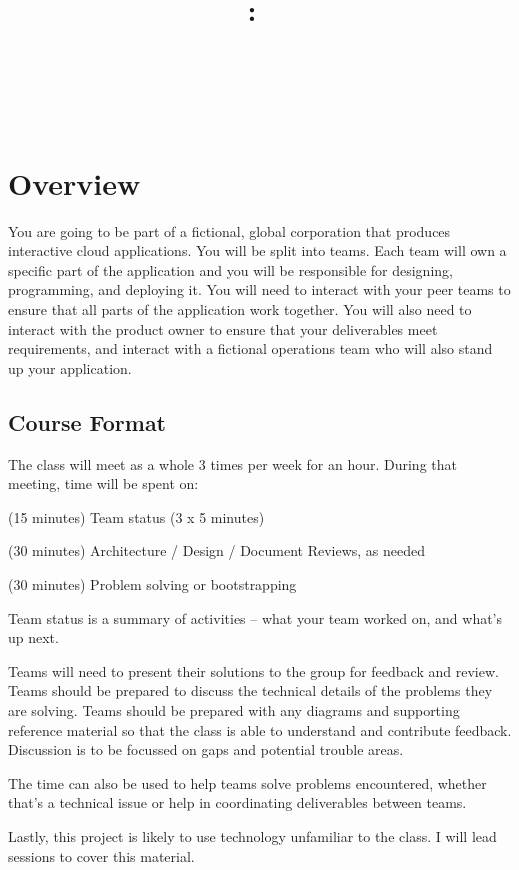 \documentclass{article}
\title{
\vspace{2in}
\textmd{\textbf{\hmwkClass:\ \hmwkTitle}}\\
\normalsize\vspace{0.1in}\hmwkDueDate\\
\vspace{0.1in}\large{\textit{\hmwkClassInstructor\ \hmwkClassTime}}
\vspace{3in}
}
\author{\textbf{\hmwkAuthorName}}
\date{} %
\newcommand{\enterProblemHeader}[1]{
}
\newcommand{\exitProblemHeader}[1]{
\nobreak\extramarks{#1}{}\nobreak
}
\newcounter{homeworkProblemCounter} %
\newcommand{\homeworkProblemName}{}
\newenvironment{homeworkProblem}[1][Problem \arabic{homeworkProblemCounter}]{ %
\stepcounter{homeworkProblemCounter} %
\renewcommand{\homeworkProblemName}{#1} %
\section{\homeworkProblemName} %
\enterProblemHeader{\homeworkProblemName} %
}{
\exitProblemHeader{\homeworkProblemName} %
}
\newcommand{\homeworkSectionName}{}
\newenvironment{homeworkSection}[1]{ %
\renewcommand{\homeworkSectionName}{#1} %
\subsection{\homeworkSectionName} %
\enterProblemHeader{\homeworkProblemName\ [\homeworkSectionName]} %
}{
\enterProblemHeader{\homeworkProblemName} %
}
\begin{document}
\maketitle\thispagestyle{empty}

\begin{homeworkProblem}[Overview]

  You are going to be part of a fictional, global corporation that produces interactive cloud applications. You will be split into teams. Each team will own a specific part of the application and you will be responsible for designing, programming, and deploying it. You will need to interact with your peer teams to ensure that all parts of the application work together. You will also need to interact with the product owner to ensure that your deliverables meet requirements, and interact with a fictional operations team who will also stand up your application.

\begin{homeworkSection}{Course Format}
  The class will meet as a whole 3 times per week for an hour. During that meeting, time will be spent on:
	\begin{compactitem}
		\item (15 minutes) Team status (3 x 5 minutes)
		\item (30 minutes) Architecture / Design / Document Reviews, as needed
		\item (30 minutes) Problem solving or bootstrapping
	\end{compactitem}

	Team status is a summary of activities -- what your team worked on, and what's up next.
	
	Teams will need to present their solutions to the group for feedback and review. Teams should be prepared to discuss the technical details of the problems they are solving. Teams should be prepared with any diagrams and supporting reference material so that the class is able to understand and contribute feedback. Discussion is to be focussed on gaps and potential trouble areas.

	The time can also be used to help teams solve problems encountered, whether that's a technical issue or help in coordinating deliverables between teams.
	
	Lastly, this project is likely to use technology unfamiliar to the class. I will lead sessions to cover this material.
\end{homeworkSection}



\end{homeworkProblem}
\end{document}
